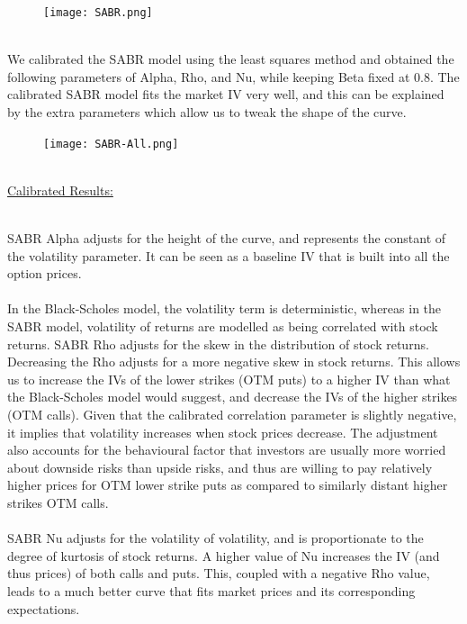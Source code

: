 \documentclass{article}
\begin{document}
\begin{figure}[ht]
	\centering
	\texttt{[image: SABR.png]}
\end{figure}
\noindent\\
We calibrated the SABR model using the least squares method and obtained the following parameters of Alpha, Rho, and Nu, while keeping Beta fixed at 0.8. The calibrated SABR model fits the market IV very well, and this can be explained by the extra parameters which allow us to tweak the shape of the curve.\\


\begin{figure}[ht]
	\centering
	\texttt{[image: SABR-All.png]}
\end{figure}

\noindent\\
\underline{Calibrated Results:}

\noindent\\SABR Alpha adjusts for the height of the curve, and represents the constant of the volatility parameter. It can be seen as a baseline IV that is built into all the option prices. \\
\noindent\\
In the Black-Scholes model, the volatility term is deterministic, whereas in the SABR model, volatility of returns are modelled as being correlated with stock returns. SABR Rho adjusts for the skew in the distribution of stock returns. Decreasing the Rho adjusts for a more negative skew in stock returns. This allows us to increase the IVs of the lower strikes (OTM puts) to a higher IV than what the Black-Scholes model would suggest, and decrease the IVs of the higher strikes (OTM calls). Given that the calibrated correlation parameter is slightly negative, it implies that volatility increases when stock prices decrease. The adjustment also accounts for the behavioural factor that investors are usually more worried about downside risks than upside risks, and thus are willing to pay relatively higher prices for OTM lower strike puts as compared to similarly distant higher strikes OTM calls. \\
\noindent\\
SABR Nu adjusts for the volatility of volatility, and is proportionate to the degree of kurtosis of stock returns. A higher value of Nu increases the IV (and thus prices) of both calls and puts. This, coupled with a negative Rho value, leads to a much better curve that fits market prices and its corresponding expectations. \\
	
\end{document}
